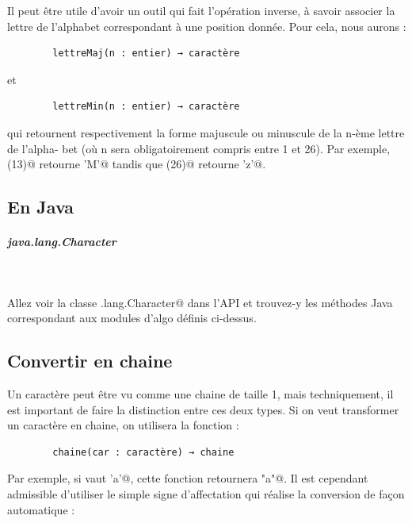 \documentclass[11pt,a4paper]{article}
\begin{document}
            \par
        
        Il peut \^etre utile d'avoir un outil qui fait l'op\'eration inverse, \`a savoir associer la lettre de
        l'alphabet correspondant \`a une position donn\'ee. Pour cela, nous aurons :
      
            \par
        \begin{verbatim}
        lettreMaj(n : entier) → caractère
      \end{verbatim}
        et
      
            \par
        \begin{verbatim}
        lettreMin(n : entier) → caractère
      \end{verbatim}
        qui retournent respectivement la forme majuscule ou minuscule de la n-\`eme lettre de l'alpha-
        bet (o\`u n sera obligatoirement compris entre 1 et 26). Par exemple, 
        \verb@lettreMaj(13)@ retourne
        \verb@’M’@ tandis que \verb@lettreMin(26)@ 
        retourne \verb@’z’@.
      
            \par
        \subsection{En Java}
			
		\subparagraph{java.lang.Character} 
		
					\textcolor{white}{.} \par
				
		    Allez voir la classe \verb@java.lang.Character@ dans l'API
		    et trouvez-y les m\'ethodes Java correspondant aux modules d'algo d\'efinis ci-dessus.
		  
            \par
        \subsection{Convertir en chaine}
		    Un caract\`ere peut \^etre vu comme une chaine de taille 1, mais techniquement, il est important
        de faire la distinction entre ces deux types. Si on veut transformer un caract\`ere en chaine,
        on utilisera la fonction :
      
            \par
        \begin{verbatim}
        chaine(car : caractère) → chaine
      \end{verbatim}
        Par exemple, si \verb@car@ vaut \verb@'a’@, 
        cette fonction retournera \verb@"a"@. Il est cependant admissible d'utiliser 
        le simple signe d'affectation qui r\'ealise la conversion de fa\c con automatique :
      
\end{document}
